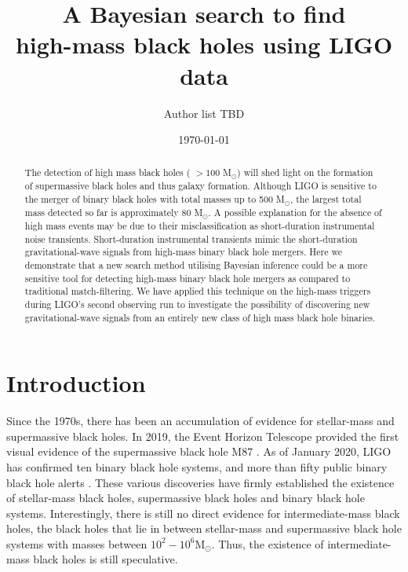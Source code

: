 \documentclass[%
 reprint,
 amsmath,amssymb,
 aps,
]{revtex4}
\begin{document}

\title{A Bayesian search to find \\high-mass black holes using LIGO data}%


\author{Author list TBD}

\date{\today}

\begin{abstract}
The detection of high mass black holes ( $>100$ M${}_\odot$) will shed light on the formation of supermassive black holes and thus galaxy formation. Although LIGO is sensitive to the merger of binary black holes with total masses up to 500 M${}_\odot$, the largest total mass detected so far is approximately 80 M${}_\odot$. A possible explanation for the absence of high mass events may be due to their misclassification as short-duration instrumental noise transients. Short-duration instrumental transients mimic the short-duration gravitational-wave signals from high-mass binary black hole mergers. Here we demonstrate that a new search method utilising Bayesian inference could be a more sensitive tool for detecting high-mass binary black hole mergers as compared to traditional match-filtering. We have applied this technique on the high-mass triggers during LIGO's second observing run to investigate the possibility of discovering new gravitational-wave signals from an entirely new class of high mass black hole binaries.


\end{abstract}

\maketitle



\section{\label{sec:Introduction}Introduction}

Since the 1970s, there has been an accumulation of evidence for stellar-mass and supermassive black holes. In 2019, the Event Horizon Telescope provided the first visual evidence of the supermassive black hole M87  \cite{m87photo}.  As of January 2020, LIGO has confirmed ten binary black hole systems, and more than fifty public binary black hole alerts \cite{gw190814}. These various discoveries have firmly established the existence of stellar-mass black holes, supermassive black holes and binary black hole systems.  Interestingly, there is still no direct evidence for intermediate-mass black holes, the black holes that lie in between stellar-mass and supermassive black hole systems with masses between $10^2-10^6 \text{M}_\odot$. Thus, the existence of intermediate-mass black holes is still speculative. 
\end{document}
